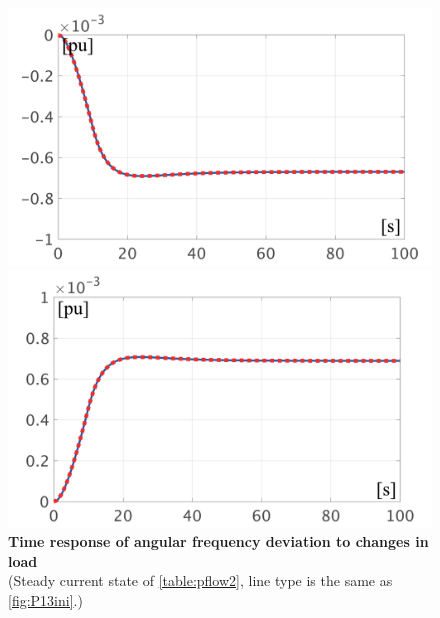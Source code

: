 \documentclass[tombow,dvipdfmx]{corona-a5-1.1}
\begin{document}
\begin{figure}[t]
  \centering
  {
  \begin{minipage}{0.49\linewidth}
    \centering
    \includegraphics[width = 1.0\linewidth]{figs/P3mi}
  \end{minipage}
  \begin{minipage}{0.49\linewidth}
    \centering
    \includegraphics[width = 1.0\linewidth]{figs/P3pl}
  \end{minipage}
  \medskip
  \caption{\textbf{Time response of angular frequency deviation to changes in load}
  \\ \centering(Steady current state of \ref{table:pflow2}, line type is the same as \ref{fig:P13ini}.)}
  \label{fig:P3load}
  }
\medskip
\end{figure}
\end{document}
